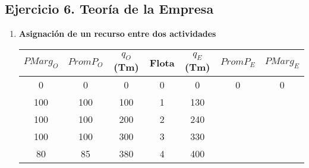 \subsection*{\center Ejercicio 6. Teoría de la Empresa}
\vspace{1cm}

\begin{enumerate}

    \item \textbf{Asignación de un recurso entre dos actividades}

	\begin{center}
	    \begin{tabular}{ccccccc}
		$PMarg_O$&$PromP_O$&$q_O$ (Tm)&Flota&$q_E$(Tm)&$PromP_E$&$PMarg_E$\\	
		\hline
			 0&0&0&0&0&0&0\\
			 100&100&100&1&130&&\\
			 100&100&200&2&240&&\\
			 100&100&300&3&330&&\\
			 80&85&380&4&400&&\\
	    \end{tabular}
	\end{center}

	\begin{center}
	\end{center}


\end{enumerate}
